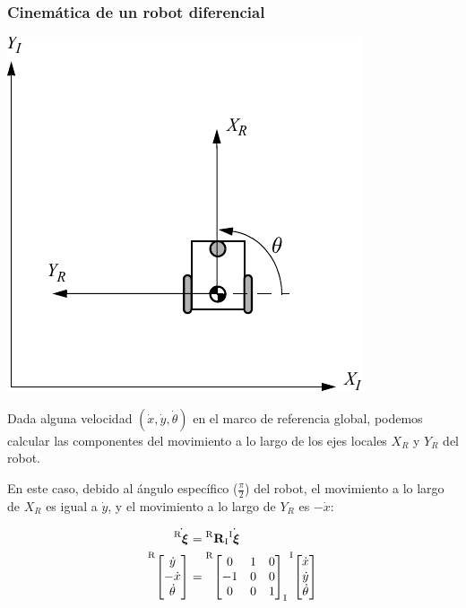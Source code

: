 \begin{frame}
    \frametitle{Cinemática de un robot diferencial}
	\scriptsize
    \begin{center}
        \includegraphics[width=0.2\columnwidth]{./images/coordinate_frame_rotation.pdf}
    \end{center}

    Dada alguna velocidad $(\dot{x}, \dot{y}, \dot{\theta})$ en el marco de referencia global, podemos calcular las componentes del movimiento a lo largo de los ejes locales $X_R$ y $Y_R$ del robot.
    
    En este caso, debido al ángulo específico ($\frac{\pi}{2}$) del robot, el movimiento a lo largo de $X_R$ es igual a $\dot{y}$, y el movimiento a lo largo de $Y_R$ es $-\dot{x}$:

    \begin{align*}
        \dot{\transform{R}{}} &= 
        \rotationCoord{R}{I}\dot{\transform{I}{}}\\
        \toCoord{\begin{bmatrix}
        			\dot{y}\\
        			-\dot{x}\\
        			\dot{\theta}
         		 \end{bmatrix}}{R}
        &=
        \fromCoord{\toCoord{\begin{bmatrix}
        	0 & 1 & 0 \\
        	-1 & 0 & 0 \\
        	0 & 0 & 1
        \end{bmatrix}}{R}}{I}
        \toCoord{\begin{bmatrix}
        			\dot{x}\\
        			\dot{y}\\
        			\dot{\theta}
        		 \end{bmatrix}}{I}
    \end{align*}
\end{frame}

